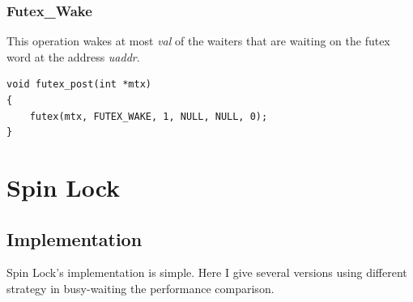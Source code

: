 \documentclass{article}
\begin{document}
	\subsubsection{Futex\_Wake}
	This operation wakes at most \emph{val} of the waiters that are waiting on the futex word at the address \emph{uaddr}. 
	\begin{lstlisting}
void futex_post(int *mtx)
{
	futex(mtx, FUTEX_WAKE, 1, NULL, NULL, 0);
}
	\end{lstlisting}
	
	\section{Spin Lock}
	\subsection{Implementation}
		Spin Lock's implementation is simple. Here I give several versions using different strategy in busy-waiting the performance comparison.
\end{document}
